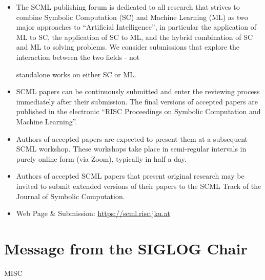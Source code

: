 \documentclass[prodmode,acmtecs]{acmsmall} %
\begin{document}
\begin{itemize}\item  The SCML publishing forum is dedicated to all research that strives to combine Symbolic Computation (SC) and Machine Learning (ML) as two major approaches to ``Artificial Intelligence'', in particular the application of ML to SC, the application of SC to ML, and the hybrid combination of SC and ML to solving problems. We consider submissions that explore the interaction between the two fields - not 
 
  standalone works on either SC or ML.  
 
\item  SCML papers can be continuously submitted and enter the reviewing process immediately after their submission. The final versions of accepted papers are published in the electronic ``RISC Proceedings on Symbolic Computation and Machine Learning''. 
 
\item  Authors of accepted papers are expected to present them at a subsequent SCML workshop. These workshops take place in semi-regular intervals in purely online form (via Zoom), typically in half a day. 
 
\item  Authors of accepted SCML papers that present original research may be invited to submit extended versions of their papers to the SCML Track of the Journal of Symbolic Computation. 
 
\item  Web Page \& Submission: \href{https://scml.risc.jku.at}{https://scml.risc.jku.at} 
 
\end{itemize}\section{Message from the SIGLOG Chair}\label{MessagefromtheSIGLOGChair}MISC 
\end{document}
